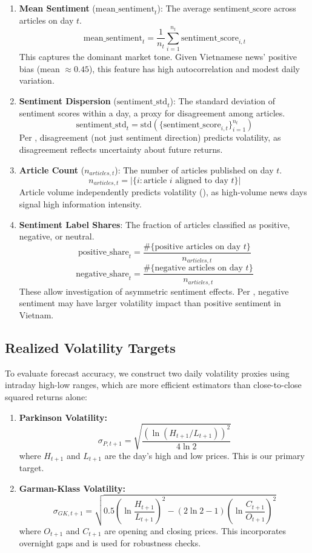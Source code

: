 \begin{enumerate}
    \item \textbf{Mean Sentiment} ($\text{mean\_sentiment}_t$): The average $\text{sentiment\_score}$ across articles on day $t$. 
    $$\text{mean\_sentiment}_t = \frac{1}{n_t} \sum_{i=1}^{n_t} \text{sentiment\_score}_{i,t}$$
    This captures the dominant market tone. Given Vietnamese news' positive bias (mean $\approx 0.45$), this feature has high autocorrelation and modest daily variation.
    
    \item \textbf{Sentiment Dispersion} ($\text{sentiment\_std}_t$): The standard deviation of sentiment scores within a day, a proxy for disagreement among articles.
    $$\text{sentiment\_std}_t = \text{std}\left(\{\text{sentiment\_score}_{i,t}\}_{i=1}^{n_t}\right)$$
    Per \citet{antweiler2004all}, disagreement (not just sentiment direction) predicts volatility, as disagreement reflects uncertainty about future returns.
    
    \item \textbf{Article Count} ($n_{articles,t}$): The number of articles published on day $t$.
    $$n_{articles,t} = \left|\{i : \text{article } i \text{ aligned to day } t\}\right|$$
    Article volume independently predicts volatility (\citet{bodilsen2025exploiting}), as high-volume news days signal high information intensity.
    
    \item \textbf{Sentiment Label Shares}: The fraction of articles classified as positive, negative, or neutral.
    $$\text{positive\_share}_t = \frac{\#\{\text{positive articles on day } t\}}{n_{articles,t}}$$
    $$\text{negative\_share}_t = \frac{\#\{\text{negative articles on day } t\}}{n_{articles,t}}$$
    These allow investigation of asymmetric sentiment effects. Per \citet{vu2023sentiments}, negative sentiment may have larger volatility impact than positive sentiment in Vietnam.
\end{enumerate}

\subsection{Realized Volatility Targets}

To evaluate forecast accuracy, we construct two daily volatility proxies using intraday high-low ranges, which are more efficient estimators than close-to-close squared returns alone:

\begin{enumerate}
    \item \textbf{Parkinson Volatility:}
    $$\sigma_{P, t+1} = \sqrt{\frac{\left(\ln(H_{t+1} / L_{t+1})\right)^2}{4 \ln 2}}$$
    where $H_{t+1}$ and $L_{t+1}$ are the day's high and low prices. This is our primary target.
    
    \item \textbf{Garman-Klass Volatility:}
    $$\sigma_{GK, t+1} = \sqrt{0.5 \left(\ln\frac{H_{t+1}}{L_{t+1}}\right)^2 - (2\ln 2 - 1)\left(\ln\frac{C_{t+1}}{O_{t+1}}\right)^2}$$
    where $O_{t+1}$ and $C_{t+1}$ are opening and closing prices. This incorporates overnight gaps and is used for robustness checks.
\end{enumerate}

